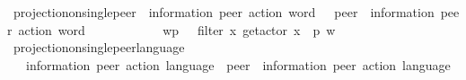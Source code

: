 \begin{isabellebody}
{}\isanewline
{}\isamarkupfalse%
\ projection{\isacharunderscore}{\kern0pt}on{\isacharunderscore}{\kern0pt}single{\isacharunderscore}{\kern0pt}peer\ {\isacharcolon}{\kern0pt}{\isacharcolon}{\kern0pt}\ {\isachardoublequoteopen}{\isacharparenleft}{\kern0pt}{\isacharprime}{\kern0pt}information{\isacharcomma}{\kern0pt}\ {\isacharprime}{\kern0pt}peer{\isacharparenright}{\kern0pt}\ action\ word\ \ {\isasymRightarrow}\ {\isacharprime}{\kern0pt}peer\ {\isasymRightarrow}\ {\isacharparenleft}{\kern0pt}{\isacharprime}{\kern0pt}information{\isacharcomma}{\kern0pt}\ {\isacharprime}{\kern0pt}peer{\isacharparenright}{\kern0pt}\ action\ word{\isachardoublequoteclose}\ \ {\isacharparenleft}{\kern0pt}{\isachardoublequoteopen}{\isacharunderscore}{\kern0pt}{\isasymdown}\isactrlsub {\isacharunderscore}{\kern0pt}{\isachardoublequoteclose}\ {\isacharbrackleft}{\kern0pt}{}{}{\isacharcomma}{\kern0pt}\ {}{}{\isacharbrackright}{\kern0pt}\ {}{}{}{\isacharparenright}{\kern0pt}\isanewline
\ \ \isanewline
\ \ \ \ {\isachardoublequoteopen}w{\isasymdown}\isactrlsub p\ \ {\isasymequiv}\ filter\ {\isacharparenleft}{\kern0pt}{\isasymlambda}x{\isachardot}{\kern0pt}\ get{\isacharunderscore}{\kern0pt}actor\ x\ {\isacharequal}{\kern0pt}\ p{\isacharparenright}{\kern0pt}\ w{\isachardoublequoteclose}\isanewline
\isanewline
{}\isamarkupfalse%
\ projection{\isacharunderscore}{\kern0pt}on{\isacharunderscore}{\kern0pt}single{\isacharunderscore}{\kern0pt}peer{\isacharunderscore}{\kern0pt}language\isanewline
\ \ {\isacharcolon}{\kern0pt}{\isacharcolon}{\kern0pt}\ {\isachardoublequoteopen}{\isacharparenleft}{\kern0pt}{\isacharprime}{\kern0pt}information{\isacharcomma}{\kern0pt}\ {\isacharprime}{\kern0pt}peer{\isacharparenright}{\kern0pt}\ action\ language\ {\isasymRightarrow}\ {\isacharprime}{\kern0pt}peer\ {\isasymRightarrow}\ {\isacharparenleft}{\kern0pt}{\isacharprime}{\kern0pt}information{\isacharcomma}{\kern0pt}\ {\isacharprime}{\kern0pt}peer{\isacharparenright}{\kern0pt}\ action\ language{\isachardoublequoteclose}\isanewline
\ \ {\isacharparenleft}{\kern0pt}{\isachardoublequoteopen}{\isacharunderscore}{\kern0pt}{\isasymdownharpoonright}\isactrlsub {\isacharunderscore}{\kern0pt}{\isachardoublequoteclose}\ {\isacharbrackleft}{\kern0pt}{}{}{\isacharcomma}{\kern0pt}\ {}{}{\isacharbrackright}{\kern0pt}\ {}{}{}{\isacharparenright}{\kern0pt}\ \isanewline

\end{isabellebody}
